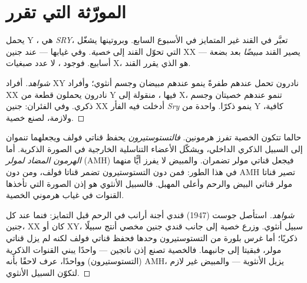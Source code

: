 \section{المورّثة التي تقرر}

\begin{proposition}\label{prop:g11:becoming-male-female:sry}
يحمل  Y ، هي \emph{SRY}، تعبَّر في القند
غير المتمايز في الأسبوع السابع. وبروتينها يشغّل  التي تحوّل
القند إلى \emph{خصية}. وفي غيابها --- عند جنين XX --- يصير القند
\emph{مبيضًا} بعد بضعة أسابيع. فوجود ، لا عدد صبغيات X، هو الذي
يقرر القند.
\end{proposition}
\begin{proof}[شواهد]
أفراد XY نادرون تحمل  عندهم طفرةً ينمو عندهم مبيضان وجسم
أنثوي؛ وأفراد XX نادرون يحملون قطعة من Y فيها ، منقولة إلى  X،
تنمو عندهم خصيتان وجسم ذكري. وفي الفئران: جنين XX أدخلت فيه 
الفأر \emph{Sry} ينمو ذكرًا.  واحدة من  Y كافية، ولازمة،
لصنع خصية.
\end{proof}

\begin{proposition}\label{prop:g11:becoming-male-female:hormones}
حالما تتكون الخصية تفرز هرمونين. \emph{فالتستوستيرون}
يحفظ قناتي فولف ويجعلهما تنموان إلى السبيل الذكري الداخلي، ويشكّل
الأعضاء التناسلية الخارجية في الصورة الذكرية. أما \emph{الهرمون المضاد
لمولر} (AMH) فيجعل قناتي مولر تضمران. والمبيض لا يفرز أيًّا منهما في
هذا الطور: فمن دون التستوستيرون تضمر قناتا فولف، ومن دون AMH تصير
قناتا مولر قناتي البيض والرحم وأعلى المهبل. فالسبيل الأنثوي هو إذن
الصورة التي تأخذها القنوات في غياب هرموني الخصية.
\end{proposition}
\begin{proof}[شواهد]
استأصل جوست (1947) قندي أجنة أرانب في الرحم قبل التمايز: فنما عند كل
جنين، XX كان أو XY، سبيل أنثوي. وزرع خصية إلى جانب قندي جنين مخصي
أنتج سبيلًا ذكريًا؛ أما غرس بلورة من التستوستيرون وحدها فحفظ قناتي فولف
لكنه لم يزل قناتي مولر، فبقيتا إلى جانبهما. فالخصية تصنع إذن ناتجين ---
واحدًا يبني القنوات الذكرية (التستوستيرون) وواحدًا، عرف لاحقًا بأنه
AMH، يزيل الأنثوية --- والمبيض غير لازم لتكوّن السبيل الأنثوي.
\end{proof}

